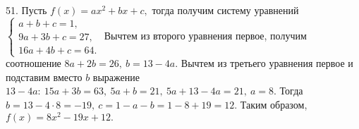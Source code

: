 51. Пусть $f(x)=ax^2+bx+c,$ тогда получим систему уравнений $\begin{cases}a+b+c=1,\\ 9a+3b+c=27,\\ 16a+4b+c=64.\end{cases}$ Вычтем из второго уравнения первое, получим соотношение $8a+2b=26,\ b=13-4a.$ Вычтем из третьего уравнения первое и подставим вместо $b$ выражение $13-4a:\ 15a+3b=63,\ 5a+b=21,\ 5a+13-4a=21,\ a=8.$ Тогда $b=13-4\cdot8=-19,\ c=1-a-b=1-8+19=12.$ Таким образом, $f(x)=8x^2-19x+12.$\\

